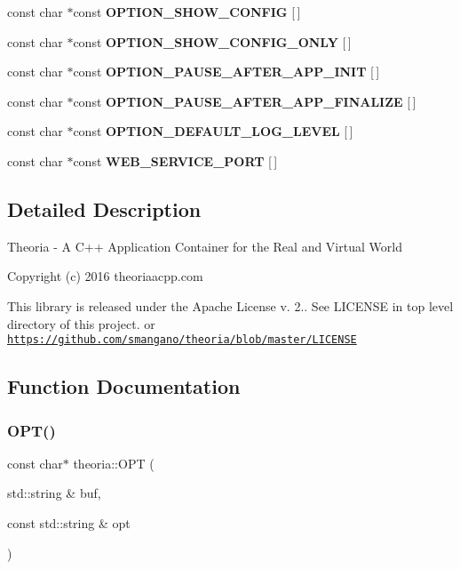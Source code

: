 \begin{DoxyCompactItemize}
\item 
const char $\ast$const {\bfseries O\+P\+T\+I\+O\+N\+\_\+\+S\+H\+O\+W\+\_\+\+C\+O\+N\+F\+IG} \mbox{[}$\,$\mbox{]}
\item 
const char $\ast$const {\bfseries O\+P\+T\+I\+O\+N\+\_\+\+S\+H\+O\+W\+\_\+\+C\+O\+N\+F\+I\+G\+\_\+\+O\+N\+LY} \mbox{[}$\,$\mbox{]}
\item 
const char $\ast$const {\bfseries O\+P\+T\+I\+O\+N\+\_\+\+P\+A\+U\+S\+E\+\_\+\+A\+F\+T\+E\+R\+\_\+\+A\+P\+P\+\_\+\+I\+N\+IT} \mbox{[}$\,$\mbox{]}
\item 
const char $\ast$const {\bfseries O\+P\+T\+I\+O\+N\+\_\+\+P\+A\+U\+S\+E\+\_\+\+A\+F\+T\+E\+R\+\_\+\+A\+P\+P\+\_\+\+F\+I\+N\+A\+L\+I\+ZE} \mbox{[}$\,$\mbox{]}
\item 
const char $\ast$const {\bfseries O\+P\+T\+I\+O\+N\+\_\+\+D\+E\+F\+A\+U\+L\+T\+\_\+\+L\+O\+G\+\_\+\+L\+E\+V\+EL} \mbox{[}$\,$\mbox{]}
\item 
const char $\ast$const {\bfseries W\+E\+B\+\_\+\+S\+E\+R\+V\+I\+C\+E\+\_\+\+P\+O\+RT} \mbox{[}$\,$\mbox{]}
\end{DoxyCompactItemize}


\subsection{Detailed Description}
Theoria -\/ A C++ Application Container for the Real and Virtual World

Copyright (c) 2016 theoriaacpp.\+com

This library is released under the Apache License v. 2.. See L\+I\+C\+E\+N\+SE in top level directory of this project. or \href{https://github.com/smangano/theoria/blob/master/LICENSE}{\tt https\+://github.\+com/smangano/theoria/blob/master/\+L\+I\+C\+E\+N\+SE} 

\subsection{Function Documentation}
\mbox{\label{namespacetheoria_ad064111544bc341abc915fd30ee47659}} 
\subsubsection{\texorpdfstring{O\+P\+T()}{OPT()}}
{\footnotesize\ttfamily const char$\ast$ theoria\+::\+O\+PT (\begin{DoxyParamCaption}\item[{std\+::string \&}]{buf,  }\item[{const std\+::string \&}]{opt }\end{DoxyParamCaption})\hspace{0.3cm}{\ttfamily [inline]}}

